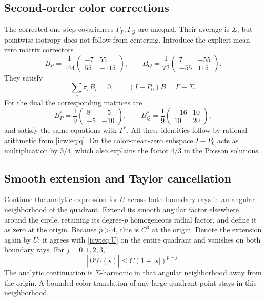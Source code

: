 \documentclass[11pt,letterpaper]{article}
\theoremstyle{remark}\newtheorem{remark}[theorem]{Remark}
\newcommand{\1}{\mathbf1}
\begin{document}
\subsection{Second-order color corrections}
The corrected one-step covariances $\Gamma_P,\Gamma_Q$ are unequal.
Their average is $\Sigma$, but pointwise isotropy does not follow from
centering. Introduce the explicit mean-zero matrix correctors
\begin{equation}\label{icw:eq:B}
 B_P=\frac1{144}\begin{pmatrix}-7&55\\55&-115\end{pmatrix},\qquad
 B_Q=\frac1{72}\begin{pmatrix}7&-55\\-55&115\end{pmatrix}.
\end{equation}
They satisfy
\begin{equation}\label{icw:eq:B-poisson}
 \sum_c\pi_cB_c=0,\qquad (I-P_0)B=\Gamma-\Sigma.
\end{equation}
For the dual the corresponding matrices are
\begin{equation}\label{icw:eq:B-dual}
 B_P^*=\frac19\begin{pmatrix}8&-5\\-5&-10\end{pmatrix},\qquad
 B_Q^*=\frac19\begin{pmatrix}-16&10\\10&20\end{pmatrix},
\end{equation}
and satisfy the same equations with $\Gamma^*$.
All these identities follow by rational arithmetic from \eqref{icw:eq:q}.
On the color-mean-zero subspace $I-P_0$ acts as multiplication by $3/4$,
which also explains the factor $4/3$ in the Poisson solutions.

\subsection{Smooth extension and Taylor cancellation}\label{icw:sub:smooth}
Continue the analytic expression for $U$ across both boundary rays in
an angular neighborhood of the quadrant. Extend its smooth angular
factor elsewhere around the circle, retaining its degree-$p$ homogeneous
radial factor, and define it as zero at the origin. Because $p>4$, this
is $C^3$ at the origin. Denote the extension again by $U$; it agrees with
\eqref{icw:eq:U} on the entire quadrant and vanishes on both boundary rays.
For $j=0,1,2,3$,
\begin{equation}\label{icw:eq:U-derivatives}
 |D^jU(s)|\le C(1+|s|)^{p-j}.
\end{equation}
The analytic continuation is $\Sigma$-harmonic in that angular
neighborhood away from the origin. A bounded color translation of any
large quadrant point stays in this neighborhood.
\end{document}
